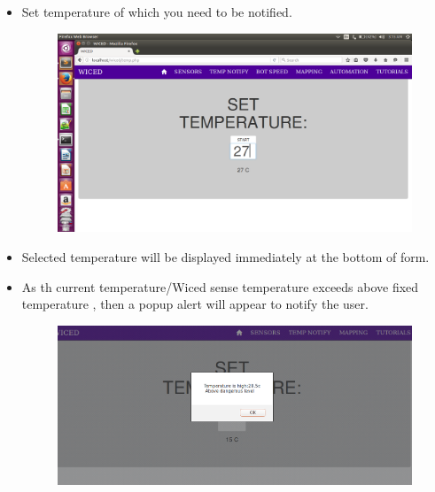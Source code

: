 \documentclass[11pt,a4paper]{article}
\begin{document}
\begin{itemize}
	 \newpage
	 \item Set temperature of which you need to be notified.
	 \begin{figure}[h]
    \centering
	\includegraphics[scale=0.3]{temp12.png}
	\end{figure}
	 
	 \item Selected temperature will be displayed immediately at the bottom of form.
	  \item As th current temperature/Wiced sense temperature exceeds above fixed temperature , then a popup alert will appear to notify the user.
	 
	  \begin{figure}[h]
    \centering
	\includegraphics[scale=0.3]{popup_alert.png}
	\end{figure}
	 \end{itemize}
	 
	 
	 \newpage
\end{document}
